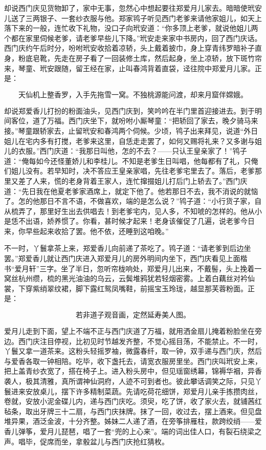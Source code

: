 却说西门庆见货物卸了，家中无事，忽然心中想起要往郑爱月儿家去。暗暗使玳安儿送了三两银子、一套纱衣服与他。郑家鸨子听见西门老爹来请他家姐儿，如天上落下来的一般，连忙收下礼物，没口子向玳安道：“你多顶上老爹，就说他姐儿两个都在家里伺候老爹，请老爹早些儿下降。”玳安走来家中书房内，回了西门庆话。西门庆约午后时分，吩咐玳安收拾着凉轿，头上戴着披巾，身上穿青纬罗暗补子直身，粉底皂靴，先走在房子看了一回装修土库，然后起身，坐上凉轿，放下斑竹帘来，琴童、玳安跟随，留王经在家，止叫春鸿背着直袋，迳往院中郑爱月儿家。正是：

\[
天仙机上整香罗，入手先拖雪一窝。
不独桃源能问渡，却来月窟伴嫦娥。
\]

却说郑爱香儿打扮的粉面油头，见西门庆到，笑吟吟在半门里首迎接进去。到于明间客位，道了万福。西门庆坐下，就吩咐小厮琴童：“把轿回了家去，晚夕骑马来接。”琴童跟轿家去，止留玳安和春鸿两个伺候。少顷，鸨子出来拜见，说道“外日姐儿在宅内多有打搅，老爹来这里，自恁走走罢了，如何又赐将礼来？又多谢与姐儿的衣服。”西门庆道：“我那日叫他，怎的不去？——只认王皇亲家了！”鸨子道：“俺每如今还怪董娇儿和李桂儿。不知是老爹生日叫唱，他每都有了礼，只俺们姐儿没有。若早知时，决不答应王皇亲家唱，先往老爹宅里去了。落后，老爹那里又差了人来，慌的老身背着王家人，连忙撺掇姐儿打后门上轿去了。”西门庆道：“先日我在他夏老爹家酒席上，就定下他了。他若那日不去，我不消说的就恼了。怎的他那日不言不语，不做喜欢，端的是怎么说？”鸨子道：“小行货子家，自从梳弄了，那里好生出去供唱去！到老爹宅内，见人多，不知唬的怎样的。他从小是恁不出语，娇养惯了。你看，甚时候才起来！老身该催促了几遍，说老爹今日来，你早些起来收拾了罢。他不依，还睡到这咱晚。”

不一时，丫鬟拿茶上来，郑爱香儿向前递了茶吃了。鸨子道：“请老爹到后边坐罢。”郑爱香儿就让西门庆进入郑爱月儿的房外明间内坐下，西门庆看见上面楷书“爱月轩”三字。坐了半日，忽听帘栊响处，郑爱月儿出来，不戴髻，头上挽着一窝丝杭州缵，梳的黑光油油的乌云，云鬓堆鸦犹若轻烟密雾。上着白藕丝对衿仙裳，下穿紫绡翠纹裙，脚下露红鸳凤嘴鞋，前摇宝玉玲珑，越显那芙蓉粉面。正是：

\[
若非道子观音画，定然延寿美人图。
\]

爱月儿走到下面，望上不端不正与西门庆道了万福，就用洒金扇儿掩着粉脸坐在旁边。西门庆注目停视，比初见时节越发齐整，不觉心摇目荡，不能禁止。不一时，丫鬟又拿一道茶来。这粉头轻摇罗袖，微露春纤，取一钟，双手递与西门庆，然后与爱香各取一钟相陪。吃毕，收下盏托去，请宽衣服房里坐。西门庆叫玳安上来，把上盖青纱衣宽了，搭在椅子上。进入粉头房中，但见瑶窗绣幕，锦褥华裀，异香袭人，极其清雅，真所谓神仙洞府，人迹不可到者也。彼此攀话调笑之际，只见丫鬟进来安放桌儿，摆下许多精制菜蔬。先请吃荷花细饼，郑爱月儿亲手拣攒肉丝，卷就，安放小泥金碟儿内，递与西门庆吃。须臾，吃了饼，收了家火去，就铺茜红毡条，取出牙牌三十二扇，与西门庆抹牌。抹了一回，收过去，摆上酒来。但见盘堆异果，酒泛金波，十分齐整。姊妹二人递了酒，在旁筝排雁柱，款跨绞绡——爱香儿弹筝，爱月儿琵琶，唱了一套“兜的上心来”。端的词出佳人口，有裂石绕梁之声。唱毕，促席而坐，拿骰盆儿与西门庆抢红猜枚。

